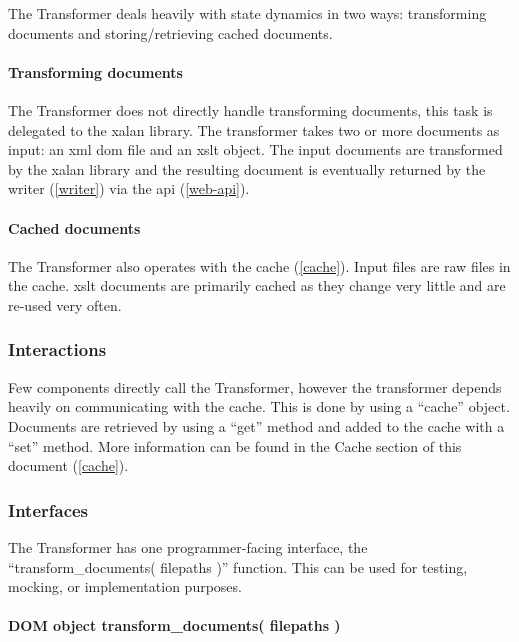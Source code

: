 The Transformer deals heavily with state dynamics in two ways: transforming documents and storing/retrieving cached documents.

\paragraph{Transforming documents}

The Transformer does not directly handle transforming documents, this task is delegated to the \gls{xalan} library. \cite{xalan-library}
The transformer takes two or more documents as input: an \gls{xml} \gls{dom} file and an \gls{xslt} object.
The input documents are transformed by the \gls{xalan} library and the resulting document is eventually returned by the writer (\ref{writer}) via the \gls{api} (\ref{web-api}).

\paragraph{Cached documents}

The Transformer also operates with the cache (\ref{cache}).
Input files are raw files in the cache.
\gls{xslt} documents are primarily cached as they change very little and are re-used very often.

\subsubsection{Interactions}

Few components directly call the Transformer, however the transformer depends heavily on communicating with the cache.
This is done by using a ``cache'' object.
Documents are retrieved by using a ``get'' method and added to the cache with a ``set'' method.
More information can be found in the Cache section of this document (\ref{cache}).

\subsubsection{Interfaces}

The Transformer has one programmer-facing interface, the ``transform\_documents( filepaths )'' function.
This can be used for testing, mocking, or implementation purposes.

\paragraph{DOM object transform\_documents( filepaths )}

